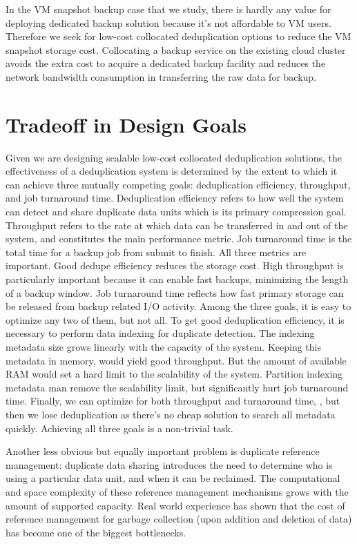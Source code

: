 In the VM snapshot backup case that we study, there is hardly any value for deploying dedicated backup
solution because it's not affordable to VM users. Therefore we seek for low-cost collocated deduplication options
to reduce the VM snapshot storage cost.
Collocating a backup service on the existing
cloud cluster avoids the extra cost to acquire a dedicated backup facility
and reduces the network bandwidth consumption in transferring the
raw data for backup. 

\section{Tradeoff in Design Goals}
\label{back:trade}
Given we are designing scalable low-cost collocated deduplication solutions,
the effectiveness of a deduplication system is determined 
by the extent to which it can achieve three mutually competing goals: 
deduplication efficiency, throughput, and job turnaround time. 
Deduplication efficiency refers to
how well the system can detect and share duplicate data
units which is its primary compression goal. Throughput refers
to the rate at which data can be transferred in and out of
the system, and constitutes the main performance metric.
Job turnaround time is the total time for a backup job from submit to finish.
All three metrics are important. Good dedupe efficiency 
reduces the storage cost. High throughput
is particularly important because it can enable fast backups, 
minimizing the length of a backup window. 
Job turnaround time reflects how fast primary storage 
can be released from backup related I/O activity.
Among the three goals, it is easy to optimize any two of them,
but not all. To get good deduplication efficiency, 
it is necessary to perform data indexing for duplicate detection.
The indexing metadata size grows linearly with the capacity of the system. 
Keeping this metadata in memory,
would yield good throughput. 
But the amount of available RAM would set a hard limit to the scalability of the
system. Partition indexing metadata man remove
the scalability limit, but significantly hurt job turnaround time.
Finally, we can optimize for both throughput and turnaround time, 
, but then we lose deduplication as there's no cheap solution to search all metadata quickly. 
Achieving all three goals is a non-trivial task.

Another less obvious but equally important problem is
duplicate reference management: duplicate data sharing
introduces the need to determine who is using a particular data unit, and when it can be reclaimed. 
The computational and space complexity of these reference management mechanisms grows 
with the amount of supported capacity. Real world experience has shown that the
cost of reference management for garbage collection (upon addition and deletion of data) 
has become one of the biggest 
bottlenecks.

